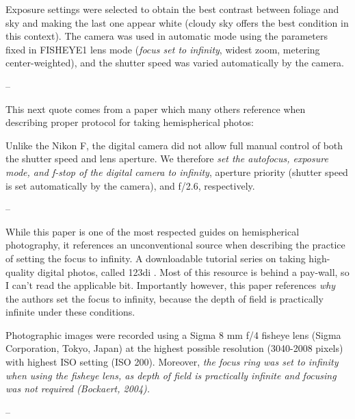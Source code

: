 \documentclass{article}
\begin{document}
\begin{minipage}{\linewidth}
\begin{framed}
Exposure settings were selected to obtain the best contrast between foliage and sky and making the last one appear white (cloudy sky offers the best condition in this context). The camera was used in automatic mode using the parameters fixed in FISHEYE1 lens mode (\textit{focus set to infinity}, widest zoom, metering center-weighted), and the shutter speed was varied automatically by the camera.

-- \citealt{Paletto2009}
\end{framed}
\end{minipage}

This next quote comes from a paper which many others reference when describing proper protocol for taking hemispherical photos: 

\begin{minipage}{\linewidth}
\begin{framed}
Unlike the Nikon F, the digital camera did not allow full manual control of both the shutter speed and lens aperture. We therefore \textit{set the autofocus, exposure mode, and f-stop of the digital camera to infinity}, aperture priority (shutter speed is set automatically by the camera), and f/2.6, respectively. 

-- \citealt{Frazer2001}
\end{framed}
\end{minipage}

While this paper is one of the most respected guides on hemispherical photography, it references an unconventional source when describing the practice of setting the focus to infinity. A downloadable tutorial series on taking high-quality digital photos, called 123di \citep{123di}. Most of this resource is behind a pay-wall, so I can't read the applicable bit. Importantly however, this paper references \textit{why} the authors set the focus to infinity, because the depth of field is practically infinite under these conditions.

\begin{minipage}{\linewidth}
\begin{framed}
Photographic images were recorded using a Sigma 8 mm f/4 fisheye lens (Sigma Corporation, Tokyo, Japan) at the highest possible resolution (3040-2008 pixels) with highest ISO setting (ISO 200). Moreover, \textit{the focus ring was set to infinity when using the fisheye lens, as depth of field is practically infinite and focusing was not required (Bockaert, 2004).}

-- \citealt{Jonckheere2005}
\end{framed}
\end{minipage}
\end{document}
